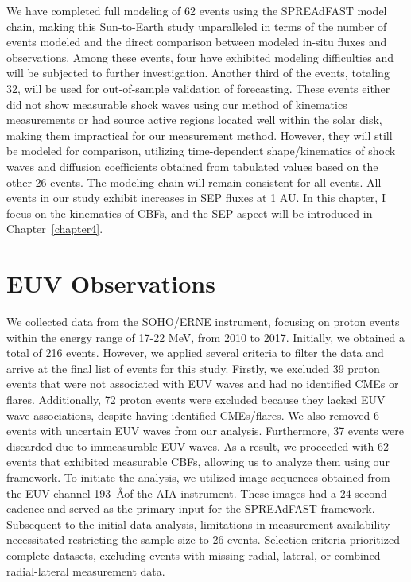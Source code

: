 We have completed full modeling of 62 events using the SPREAdFAST model chain, making this Sun-to-Earth study unparalleled in terms of the number of events modeled and the direct comparison between modeled in-situ fluxes and observations. Among these events, four have exhibited modeling difficulties and will be subjected to further investigation. Another third of the events, totaling 32, will be used for out-of-sample validation of forecasting. These events either did not show measurable shock waves using our method of kinematics measurements or had source active regions located well within the solar disk, making them impractical for our measurement method. However, they will still be modeled for comparison, utilizing time-dependent shape/kinematics of shock waves and diffusion coefficients obtained from tabulated values based on the other 26 events. The modeling chain will remain consistent for all events. All events in our study exhibit increases in SEP fluxes at 1 AU.
In this chapter, I focus on the kinematics of CBFs, and the SEP aspect will be introduced in Chapter~\ref{chapter4}.

\section{EUV Observations}
We collected data from the SOHO/ERNE instrument, focusing on proton events within the energy range of 17-22 MeV, from 2010 to 2017. Initially, we obtained a total of 216 events. However, we applied several criteria to filter the data and arrive at the final list of events for this study.
Firstly, we excluded 39 proton events that were not associated with EUV waves and had no identified CMEs or flares. Additionally, 72 proton events were excluded because they lacked EUV wave associations, despite having identified CMEs/flares. We also removed 6 events with uncertain EUV waves from our analysis. Furthermore, 37 events were discarded due to immeasurable EUV waves. As a result, we proceeded with 62 events that exhibited measurable CBFs, allowing us to analyze them using our framework.
To initiate the analysis, we utilized image sequences obtained from the EUV channel 193~\AA of the AIA instrument. These images had a 24-second cadence and served as the primary input for the SPREAdFAST framework. Subsequent to the initial data analysis, limitations in measurement availability necessitated restricting the sample size to 26 events. Selection criteria prioritized complete datasets, excluding events with missing radial, lateral, or combined radial-lateral measurement data.

